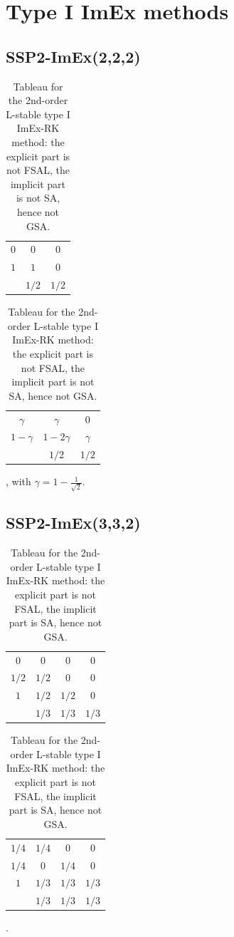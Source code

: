 \documentclass{article}
\begin{document}
\section{Type I ImEx methods}
\label{app:Tyep_I_ImEx_Methods}
\subsection{SSP2-ImEx(2,2,2)}
\begin{table}[H]
    \centering
    \begin{tabular}{c|cc}
        $0$ & $0$ & $0$ \\
        $1$ & $1$ & $0$ \\
        \hline
        & $1/2$ & $1/2$ \\
    \end{tabular}
    \quad
    \begin{tabular}{c|cc}
        $\gamma$  & $\gamma$  & $0$        \\
        $1 - \gamma$ & $1 - 2\gamma$ & $\gamma$ \\
        \hline
        & $1/2$ & $1/2$ \\
    \end{tabular} \;, with $\gamma = 1-\frac{1}{\sqrt{2}}$.
    \caption{Tableau for the 2nd-order L-stable type I ImEx-RK method: the explicit part is
    not FSAL, the implicit part is not SA, hence not GSA.}
    \label{tab:SSP2ImEx222}
\end{table}

\subsection{SSP2-ImEx(3,3,2)}
\begin{table}[H]
    \centering
    \begin{tabular}{c|ccc}
        $0$ & $0$ & $0$ & $0$ \\
        $1/2$ & $1/2$ & $0$ & $0$ \\
        $1$ & $1/2$ & $1/2$ & $0$ \\
        \hline
        & $1/3$ & $1/3$ & $1/3$ \\
    \end{tabular}
    \quad
    \begin{tabular}{c|ccc}
        $1/4$ & $1/4$ & $0$ & $0$ \\
        $1/4$ & $0$ & $1/4$ & $0$ \\
        $1$ & $1/3$ & $1/3$ & $1/3$ \\
        \hline
        & $1/3$ & $1/3$ & $1/3$ \\
    \end{tabular} \;.
    \caption{Tableau for the 2nd-order L-stable type I ImEx-RK method: the explicit part is not FSAL,
    the implicit part is SA, hence not GSA.}
    \label{tab:SSP2ImEx332}
\end{table}
\end{document}
